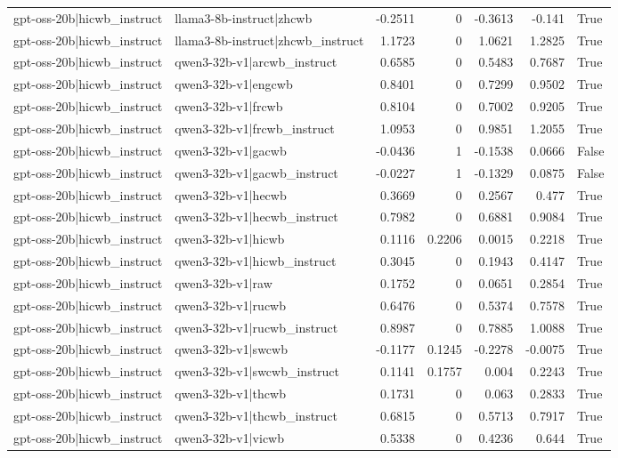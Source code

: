 \begin{table}
\begin{tabular}{l l r r r r l}
gpt-oss-20b|hicwb_instruct & llama3-8b-instruct|zhcwb & -0.2511 & 0 & -0.3613 & -0.141 & True \\
gpt-oss-20b|hicwb_instruct & llama3-8b-instruct|zhcwb_instruct & 1.1723 & 0 & 1.0621 & 1.2825 & True \\
gpt-oss-20b|hicwb_instruct & qwen3-32b-v1|arcwb_instruct & 0.6585 & 0 & 0.5483 & 0.7687 & True \\
gpt-oss-20b|hicwb_instruct & qwen3-32b-v1|engcwb & 0.8401 & 0 & 0.7299 & 0.9502 & True \\
gpt-oss-20b|hicwb_instruct & qwen3-32b-v1|frcwb & 0.8104 & 0 & 0.7002 & 0.9205 & True \\
gpt-oss-20b|hicwb_instruct & qwen3-32b-v1|frcwb_instruct & 1.0953 & 0 & 0.9851 & 1.2055 & True \\
gpt-oss-20b|hicwb_instruct & qwen3-32b-v1|gacwb & -0.0436 & 1 & -0.1538 & 0.0666 & False \\
gpt-oss-20b|hicwb_instruct & qwen3-32b-v1|gacwb_instruct & -0.0227 & 1 & -0.1329 & 0.0875 & False \\
gpt-oss-20b|hicwb_instruct & qwen3-32b-v1|hecwb & 0.3669 & 0 & 0.2567 & 0.477 & True \\
gpt-oss-20b|hicwb_instruct & qwen3-32b-v1|hecwb_instruct & 0.7982 & 0 & 0.6881 & 0.9084 & True \\
gpt-oss-20b|hicwb_instruct & qwen3-32b-v1|hicwb & 0.1116 & 0.2206 & 0.0015 & 0.2218 & True \\
gpt-oss-20b|hicwb_instruct & qwen3-32b-v1|hicwb_instruct & 0.3045 & 0 & 0.1943 & 0.4147 & True \\
gpt-oss-20b|hicwb_instruct & qwen3-32b-v1|raw & 0.1752 & 0 & 0.0651 & 0.2854 & True \\
gpt-oss-20b|hicwb_instruct & qwen3-32b-v1|rucwb & 0.6476 & 0 & 0.5374 & 0.7578 & True \\
gpt-oss-20b|hicwb_instruct & qwen3-32b-v1|rucwb_instruct & 0.8987 & 0 & 0.7885 & 1.0088 & True \\
gpt-oss-20b|hicwb_instruct & qwen3-32b-v1|swcwb & -0.1177 & 0.1245 & -0.2278 & -0.0075 & True \\
gpt-oss-20b|hicwb_instruct & qwen3-32b-v1|swcwb_instruct & 0.1141 & 0.1757 & 0.004 & 0.2243 & True \\
gpt-oss-20b|hicwb_instruct & qwen3-32b-v1|thcwb & 0.1731 & 0 & 0.063 & 0.2833 & True \\
gpt-oss-20b|hicwb_instruct & qwen3-32b-v1|thcwb_instruct & 0.6815 & 0 & 0.5713 & 0.7917 & True \\
gpt-oss-20b|hicwb_instruct & qwen3-32b-v1|vicwb & 0.5338 & 0 & 0.4236 & 0.644 & True \\

\end{tabular}
\end{table}
